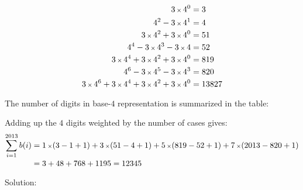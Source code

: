 \begin{align*}
3 \mult 4^{0} 
& = 3
\\
4^{2} - 3 \mult 4^{1} 
& = 4
\\
3 \mult 4^{2} + 3 \mult 4^{0} 
& = 51
\\
4^{4} - 3 \mult 4^{3} - 3 \mult 4 
& = 52
\\
3 \mult 4^{4} + 3 \mult 4^{2} + 3 \mult 4^{0} 
& = 819
\\
4^{6} - 3 \mult 4^{5} - 3 \mult 4^{3} 
& = 820
\\
3 \mult 4^{6} + 3 \mult 4^{4} + 3 \mult 4^{2} + 3 \mult 4^{0} 
& = 13827
\end{align*}

The number of digits in base-$4$ representation is summarized in the table:
\begin{table}[H]
\end{table}

Adding up the $4$ digits weighted by the number of cases gives:
\begin{align*}
\sum_{i=1}^{2013} b(i)
& = 1 \mult (3-1+1)
  + 3 \mult (51-4+1)
  + 5 \mult (819-52+1)
  + 7 \mult (2013-820+1)
\\
& = 3 + 48 + 768 + 1195
  = 12345
\end{align*}

Solution: 
